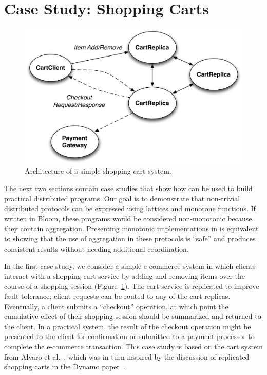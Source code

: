 \section{Case Study: Shopping Carts}
\label{sec:carts}

\begin{figure}[t]
\includegraphics[width=\linewidth]{fig/cart_arch.pdf}
\caption{Architecture of a simple shopping cart system.}
\label{fig:cart-system-arch}
\end{figure}

The next two sections contain case studies that show how \lang can be used to
build practical distributed programs. Our goal is to demonstrate that
non-trivial distributed protocols can be expressed using lattices and monotone
functions. If written in Bloom, these programs would be considered non-monotonic
because they contain aggregation. Presenting monotonic implementations in \lang
is equivalent to showing that the use of aggregation in these protocols is
``safe'' and produces consistent results without needing additional
coordination.

In the first case study, we consider a simple e-commerce system in which clients
interact with a shopping cart service by adding and removing items over the
course of a shopping session (Figure~\ref{fig:cart-system-arch}). The cart service is
replicated to improve fault tolerance; client requests can be routed to any of
the cart replicas. Eventually, a client submits a ``checkout'' operation, at
which point the cumulative effect of their shopping session should be summarized
and returned to the client. In a practical system, the result of the checkout
operation might be presented to the client for confirmation or submitted to a
payment processor to complete the e-commerce transaction. This case study is
based on the cart system from Alvaro et al.~\cite{Alvaro2011}, which was in turn
inspired by the discussion of replicated shopping carts in the Dynamo
paper~\cite{DeCandia2007}.

